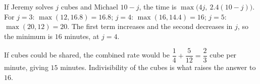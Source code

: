 If Jeremy solves $j$ cubes and Michael $10-j$, the time is $\max\bigl(4j,\ 2.4(10-j)\bigr)$. For $j=3$: $\max(12,16.8)=16.8$; $j=4$: $\max(16,14.4)=16$; $j=5$: $\max(20,12)=20$. The first term increases and the second decreases in $j$, so the minimum is $\boxed{16}$ minutes, at $j=4$.

If cubes could be shared, the combined rate would be $\dfrac14+\dfrac5{12}=\dfrac23$ cube per minute, giving $15$ minutes. Indivisibility of the cubes is what raises the answer to $16$.
